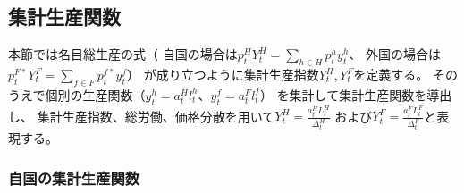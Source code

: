 
\subsection{集計生産関数}
\label{sec:chapter3_producers_aggregated_production}
本節では名目総生産の式（
自国の場合は\(p_t^HY_t^H=\sum_{h\in H}p_t^hy_t^h\)、
外国の場合は\(p_t^{F*}Y_t^F=\sum_{f\in F}p_t^{f*}y_t^f\)）
が成り立つように集計生産指数\(Y_t^H, Y_t^F\)を定義する。
そのうえで個別の生産関数（\(y_t^h=a_t^Hl_t^h\)、\(y_t^f=a_t^Fl_t^f\)）
を集計して集計生産関数を導出し、
集計生産指数、総労働、価格分散を用いて\(Y_t^H=\frac{a_t^HL_t^H}{\Delta_t^H}\)
および\(Y_t^F=\frac{a_t^FL_t^F}{\Delta_t^F}\)と表現する。

\subsubsection{自国の集計生産関数}
\label{sec:chapter3_producers_aggregated_production_home}

